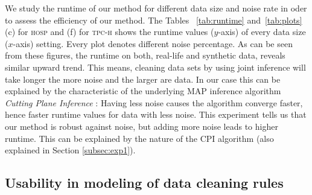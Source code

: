 We study the runtime of our method for different data size and noise rate in oder to assess the efficiency of our method. The Tables ~\ref{tab:runtime} and~\ref{tab:plots} (c) for \textsc{hosp} and (f) for \textsc{tpc-h} shows the runtime values ($y$-axis) of every data size ($x$-axis) setting. Every plot denotes different noise percentage. As can be seen from these figures, the runtime on both, real-life and synthetic data, reveals similar upward trend. This means, cleaning data sets by using joint inference will take longer the more noise and the larger are data. In our case this can be explained by the characteristic of the underlying MAP inference algorithm \textit{Cutting Plane Inference} \cite{riedel08improving}: Having less noise causes the algorithm converge faster, hence faster runtime values for data with less noise. 
This experiment tells us that our method is robust against noise, but adding more noise leads to higher runtime. This can be explained by the nature of the CPI algorithm (also explained in Section \ref{subsec:exp1}).

\subsection{Usability in modeling of data cleaning rules}

